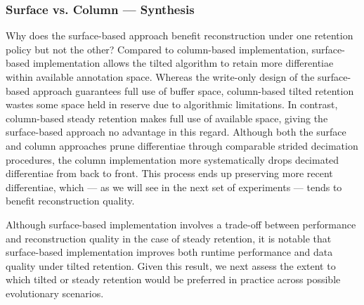 \subsubsection{Surface vs. Column --- Synthesis}

Why does the surface-based approach benefit reconstruction under one retention policy but not the other?
Compared to column-based implementation, surface-based implementation allows the tilted algorithm to retain more differentiae within available annotation space.
Whereas the write-only design of the surface-based approach guarantees full use of buffer space, column-based tilted retention wastes some space held in reserve due to algorithmic limitations.
In contrast, column-based steady retention makes full use of available space, giving the surface-based approach no advantage in this regard.
Although both the surface and column approaches prune differentiae through comparable strided decimation procedures, the column implementation more systematically drops decimated differentiae from back to front.
This process ends up preserving more recent differentiae, which --- as we will see in the next set of experiments --- tends to benefit reconstruction quality.

Although surface-based implementation involves a trade-off between performance and reconstruction quality in the case of steady retention, it is notable that surface-based implementation improves both runtime performance and data quality under tilted retention.
Given this result, we next assess the extent to which tilted or steady retention would be preferred in practice across possible evolutionary scenarios.




